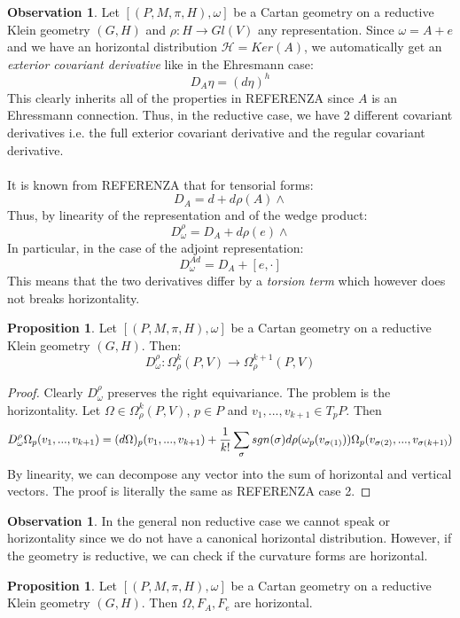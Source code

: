 \documentclass[12pt,a4paper]{report}
\theoremstyle{definition}
\theoremstyle{Theorem}
\newtheorem{Prop}[Def]{Proposition}
\theoremstyle{definition}
\theoremstyle{definition}
\newtheorem{Obs}[Def]{Observation}
\begin{document}
	\begin{Obs}
		Let $[(P,M,\pi,H),\omega]$ be a Cartan geometry on a reductive Klein geometry $(G,H)$ and $\rho:H\rightarrow Gl(V)$ any representation. Since $\omega=A+e$ and we have an horizontal distribution $\mathcal{H}=Ker(A)$, we automatically get an \textit{exterior covariant derivative} like in the Ehresmann case:
		$$D_A\eta=(d\eta)^h$$
		This clearly inherits all of the properties in REFERENZA since $A$ is an Ehressmann connection. Thus, in the reductive case, we have 2 different covariant derivatives i.e. the full exterior covariant derivative and the regular covariant derivative. \\
		\\
		It is known from REFERENZA that for tensorial forms:
		$$D_A=d+d\rho(A)\wedge$$
		Thus, by linearity of the representation and of the wedge product:
		$$D_\omega^{\rho}=D_A+d\rho(e)\wedge$$
		In particular, in the case of the adjoint representation:
		$$D_\omega^{Ad}=D_A+[e,\cdot]$$
		This means that the two derivatives differ by a \textit{torsion term} which however does not breaks horizontality.
	\end{Obs}
	\begin{Prop}
		Let $[(P,M,\pi,H),\omega]$ be a Cartan geometry on a reductive Klein geometry $(G,H)$. Then:
		$$D_\omega^\rho:\Omega^k_{\rho}(P,V)\rightarrow \Omega^{k+1}_{\rho}(P,V)$$
	\end{Prop}
	\begin{proof}
		Clearly $D_\omega^\rho$ preserves the right equivariance. The problem is the horizontality. Let $\Omega\in\Omega^k_\rho(P,V)$, $p\in P$ and $v_1,...,v_{k+1}\in T_pP$. Then 
		$$D_\omega^\rho\Omega_p(v_1,...,v_{k+1})=(d\Omega)_p(v_1,...,v_{k+1})+{1\over k!}\sum_\sigma sgn(\sigma)d\rho(\omega_p(v_{\sigma(1)}))\Omega_p(v_{\sigma(2)},...,v_{\sigma(k+1)})$$
		By linearity, we can decompose any vector into the sum of horizontal and vertical vectors. The proof is literally the same as REFERENZA case 2.
	\end{proof}
	\begin{Obs}
		In the general non reductive case we cannot speak or horizontality since we do not have a canonical horizontal distribution. However, if the geometry is reductive, we can check if the curvature forms are horizontal. 
	\end{Obs}
	\begin{Prop}
		Let $[(P,M,\pi,H),\omega]$ be a Cartan geometry on a reductive Klein geometry $(G,H)$. Then $\Omega, F_A,F_e$ are horizontal.
	\end{Prop}
\end{document}
